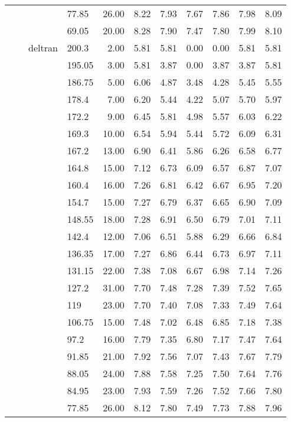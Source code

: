 \begin{longtable}{llllrrrrrrr}
   &  &  & 77.85 & 26.00 & 8.22 & 7.93 & 7.67 & 7.86 & 7.98 & 8.09 \\ 
   &  &  & 69.05 & 20.00 & 8.28 & 7.90 & 7.47 & 7.80 & 7.99 & 8.10 \\ 
   &  & deltran & 200.3 & 2.00 & 5.81 & 5.81 & 0.00 & 0.00 & 5.81 & 5.81 \\ 
   &  &  & 195.05 & 3.00 & 5.81 & 3.87 & 0.00 & 3.87 & 3.87 & 5.81 \\ 
   &  &  & 186.75 & 5.00 & 6.06 & 4.87 & 3.48 & 4.28 & 5.45 & 5.55 \\ 
   &  &  & 178.4 & 7.00 & 6.20 & 5.44 & 4.22 & 5.07 & 5.70 & 5.97 \\ 
   &  &  & 172.2 & 9.00 & 6.45 & 5.81 & 4.98 & 5.57 & 6.03 & 6.22 \\ 
   &  &  & 169.3 & 10.00 & 6.54 & 5.94 & 5.44 & 5.72 & 6.09 & 6.31 \\ 
   &  &  & 167.2 & 13.00 & 6.90 & 6.41 & 5.86 & 6.26 & 6.58 & 6.77 \\ 
   &  &  & 164.8 & 15.00 & 7.12 & 6.73 & 6.09 & 6.57 & 6.87 & 7.07 \\ 
   &  &  & 160.4 & 16.00 & 7.26 & 6.81 & 6.42 & 6.67 & 6.95 & 7.20 \\ 
   &  &  & 154.7 & 15.00 & 7.27 & 6.79 & 6.37 & 6.65 & 6.90 & 7.09 \\ 
   &  &  & 148.55 & 18.00 & 7.28 & 6.91 & 6.50 & 6.79 & 7.01 & 7.11 \\ 
   &  &  & 142.4 & 12.00 & 7.06 & 6.51 & 5.88 & 6.29 & 6.66 & 6.84 \\ 
   &  &  & 136.35 & 17.00 & 7.27 & 6.86 & 6.44 & 6.73 & 6.97 & 7.11 \\ 
   &  &  & 131.15 & 22.00 & 7.38 & 7.08 & 6.67 & 6.98 & 7.14 & 7.26 \\ 
   &  &  & 127.2 & 31.00 & 7.70 & 7.48 & 7.28 & 7.39 & 7.52 & 7.65 \\ 
   &  &  & 119 & 23.00 & 7.70 & 7.40 & 7.08 & 7.33 & 7.49 & 7.64 \\ 
   &  &  & 106.75 & 15.00 & 7.48 & 7.02 & 6.48 & 6.85 & 7.18 & 7.38 \\ 
   &  &  & 97.2 & 16.00 & 7.79 & 7.35 & 6.80 & 7.17 & 7.47 & 7.64 \\ 
   &  &  & 91.85 & 21.00 & 7.92 & 7.56 & 7.07 & 7.43 & 7.67 & 7.79 \\ 
   &  &  & 88.05 & 24.00 & 7.88 & 7.58 & 7.25 & 7.50 & 7.64 & 7.76 \\ 
   &  &  & 84.95 & 23.00 & 7.93 & 7.59 & 7.26 & 7.52 & 7.66 & 7.80 \\ 
   &  &  & 77.85 & 26.00 & 8.12 & 7.80 & 7.49 & 7.73 & 7.88 & 7.96 \\ 

\end{longtable}

